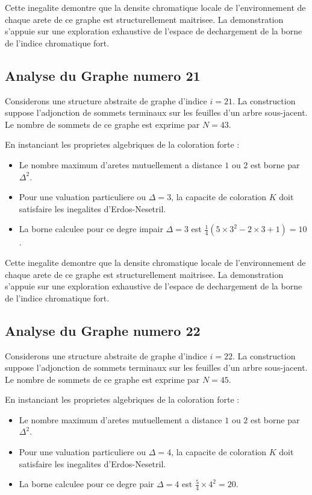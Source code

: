 \documentclass[11pt,a4paper]{article}
\begin{document}
Cette inegalite demontre que la densite chromatique locale de l'environnement de chaque arete de ce graphe est structurellement maitrisee. La demonstration s'appuie sur une exploration exhaustive de l'espace de dechargement de la borne de l'indice chromatique fort.

\subsection{Analyse du Graphe numero 21}
Considerons une structure abstraite de graphe d'indice $i = 21$. La construction suppose l'adjonction de sommets terminaux sur les feuilles d'un arbre sous-jacent. Le nombre de sommets de ce graphe est exprime par $N = 43$.

En instanciant les proprietes algebriques de la coloration forte :
\begin{itemize}
\item Le nombre maximum d'aretes mutuellement a distance $1$ ou $2$ est borne par $\Delta^2$.
\item Pour une valuation particuliere ou $\Delta = 3$, la capacite de coloration $K$ doit satisfaire les inegalites d'Erdos-Nesetril.
\item La borne calculee pour ce degre impair $\Delta = 3$ est $\frac{1}{4}(5 \times 3^2 - 2 \times 3 + 1) = 10$.
\end{itemize}

Cette inegalite demontre que la densite chromatique locale de l'environnement de chaque arete de ce graphe est structurellement maitrisee. La demonstration s'appuie sur une exploration exhaustive de l'espace de dechargement de la borne de l'indice chromatique fort.

\subsection{Analyse du Graphe numero 22}
Considerons une structure abstraite de graphe d'indice $i = 22$. La construction suppose l'adjonction de sommets terminaux sur les feuilles d'un arbre sous-jacent. Le nombre de sommets de ce graphe est exprime par $N = 45$.

En instanciant les proprietes algebriques de la coloration forte :
\begin{itemize}
\item Le nombre maximum d'aretes mutuellement a distance $1$ ou $2$ est borne par $\Delta^2$.
\item Pour une valuation particuliere ou $\Delta = 4$, la capacite de coloration $K$ doit satisfaire les inegalites d'Erdos-Nesetril.
\item La borne calculee pour ce degre pair $\Delta = 4$ est $\frac{5}{4} \times 4^2 = 20$.
\end{itemize}
\end{document}
